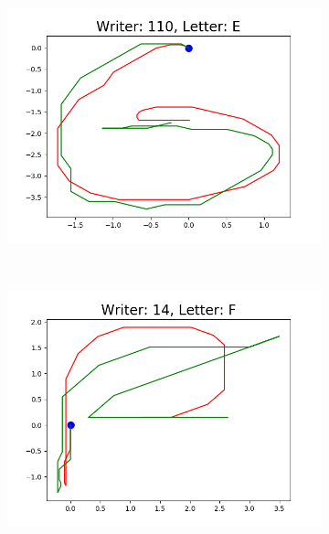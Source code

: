 \begin{figure}
\begin{subfigure}[b]{0.17\textwidth}
          \includegraphics[width=\textwidth]{images/framework/comparison_figures/E_110.png}
      \end{subfigure}
      ~
      \begin{subfigure}[b]{0.17\textwidth}
          \includegraphics[width=\textwidth]{images/framework/comparison_figures/F_14.png}
      \end{subfigure}
      ~
      \begin{subfigure}[b]{0.17\textwidth}

\end{subfigure}
\end{figure}
